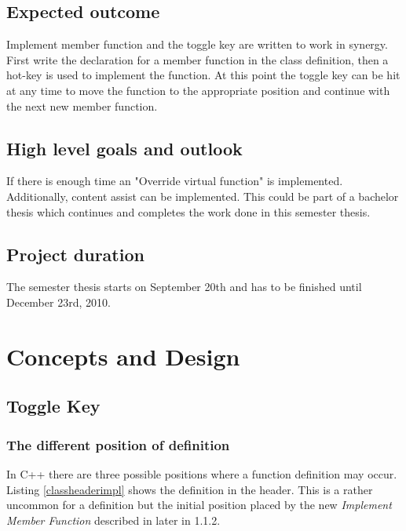 \documentclass[a4paper,12pt]{scrreprt}
\begin{document}
\section{Expected outcome}

Implement member function and the toggle key are written to work in synergy.
First write the declaration for a member function in the class definition, then
a hot-key is used to implement the function. At this point the toggle key can
be hit at any time to move the function to the appropriate position and
continue with the next new member function.

\section{High level goals and outlook}

If there is enough time an "Override virtual function" is implemented.
Additionally, content assist can be implemented. This could be part of a
bachelor thesis which continues and completes the work done in this semester
thesis.

\section{Project duration}
The semester thesis starts on September 20th and has to be finished until
December 23rd, 2010.

\chapter{Concepts and Design}
\thispagestyle{fancy}

\section{Toggle Key}

\subsection{The different position of definition}

In C++ there are three possible positions where a  function definition may occur. Listing \ref{classheaderimpl} shows
the definition in the header. This is a rather uncommon for a definition but the
initial position placed by the new \textit{Implement Member Function} described
in later in 1.1.2.

\end{document}
